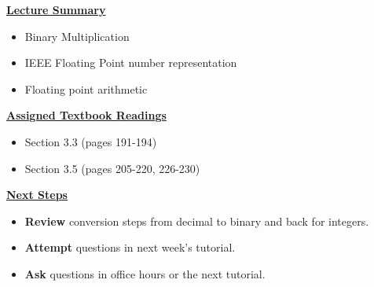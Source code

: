 







\begin{frame}[fragile]
 \underline{\textbf{Lecture Summary}}
 \begin{itemize}
   \item Binary Multiplication
    \item IEEE Floating Point number representation
    \item Floating point arithmetic 
 \end{itemize}
 \underline{\textbf{Assigned Textbook Readings}}
     \begin{itemize}
\item Section 3.3 (pages 191-194)
\item Section 3.5 (pages 205-220, 226-230)
\end{itemize}

    \underline{\textbf{Next Steps}}
    \begin{itemize}
     \item \textbf{Review} conversion steps from decimal to binary and back for integers. 
\item \textbf{Attempt} questions in next week's tutorial. 
    \item \textbf{Ask} questions in office hours or the next tutorial.
 \end{itemize}

\end{frame}

